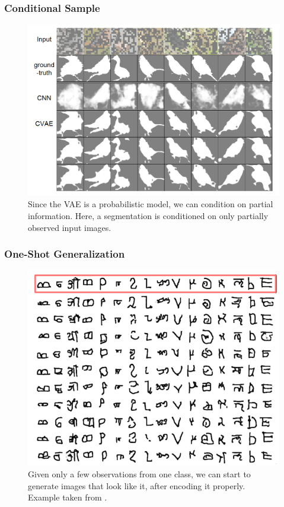 \documentclass[10pt,mathserif]{beamer}
\begin{document}
\begin{frame}
  \frametitle{Conditional Sample}
\begin{figure}[ht]
  \centering
  \includegraphics[width=0.6\paperwidth]{figure/vae_conditional}
  \caption{Since the VAE is a probabilistic model, we can condition on partial
    information. Here, a segmentation is conditioned on only partially observed
    input images. \label{fig:vae_conditional} }
\end{figure}
\end{frame}

\begin{frame}
  \frametitle{One-Shot Generalization}
  \begin{figure}[ht]
  \centering
  \includegraphics[width=0.5\paperwidth]{figure/vae_omniglot}
  \caption{Given only a few observations from one class, we can start to
    generate images that look like it, after encoding it properly. Example taken
    from \citep{rezende2016one}.}
\end{figure}
\end{frame}
\end{document}
